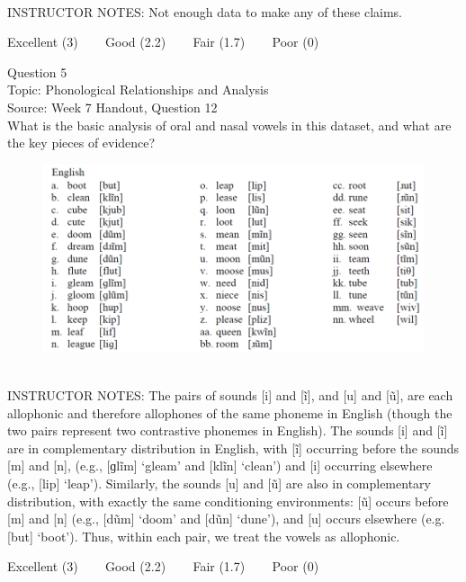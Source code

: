 \documentclass[12pt]{article}
\begin{document}
~\\
INSTRUCTOR NOTES: Not enough data to make any of these claims.


\vfill
Excellent (3) ~~~ Good (2.2) ~~~ Fair (1.7) ~~~ Poor (0)
\newpage

{\large Question 5}\\

Topic: Phonological Relationships and Analysis\\
Source: Week 7 Handout, Question 12\\

What is the basic analysis of oral and nasal vowels in this dataset, and what are the key pieces of evidence?\\

\begin{figure}[H]
\includegraphics{../images/english12.png}
\end{figure}

~\\
INSTRUCTOR NOTES: The pairs of sounds [i] and [ĩ], and [u] and [ũ], are each allophonic and therefore allophones of the same phoneme in English (though the two pairs represent two contrastive phonemes in English). The sounds [i] and [ĩ] are in complementary distribution in English, with [ĩ] occurring before the sounds [m] and [n], (e.g., [ɡlĩm] ‘gleam’ and [klĩn] ‘clean’) and [i] occurring elsewhere (e.g., [lip] ‘leap’). Similarly, the sounds [u] and [ũ] are also in complementary distribution, with exactly the same conditioning environments: [ũ] occurs before [m] and [n] (e.g., [dũm] ‘doom’ and [dũn] ‘dune’), and [u] occurs elsewhere (e.g. [but] ‘boot’). Thus, within each pair, we treat the vowels as allophonic. 


\vfill
Excellent (3) ~~~ Good (2.2) ~~~ Fair (1.7) ~~~ Poor (0)
\newpage

\begin{center}
\textbf{{\color{red}{\HUGE END OF EXAM}}}\\

\end{center}
\newpage
\end{document}
